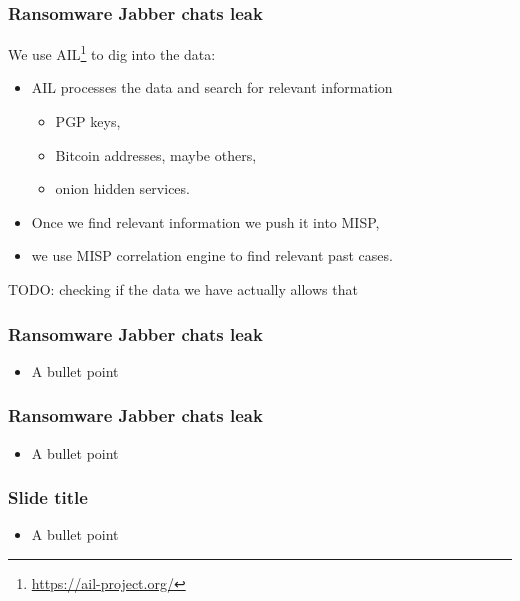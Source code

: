 \begin{frame}
    \frametitle{Ransomware Jabber chats leak}
	We use AIL\footnote{\url{https://ail-project.org/}} to dig into the data:
    \begin{itemize}
        \item AIL processes the data and search for relevant information
    	\begin{itemize}
		\item PGP keys,
		\item Bitcoin addresses, maybe others,
		\item onion hidden services.
    	\end{itemize}
	\item Once we find relevant information we push it into MISP,
	\item we use MISP correlation engine to find relevant past cases.
    \end{itemize}
	TODO: checking if the data we have actually allows that
\end{frame}



\begin{frame}
    \frametitle{Ransomware Jabber chats leak}
    \begin{itemize}
        \item A bullet point
    \end{itemize}

\end{frame}



\begin{frame}
    \frametitle{Ransomware Jabber chats leak}
    \begin{itemize}
        \item A bullet point
    \end{itemize}

\end{frame}



\begin{frame}
    \frametitle{Slide title}
    \begin{itemize}
        \item A bullet point
    \end{itemize}

\end{frame}




